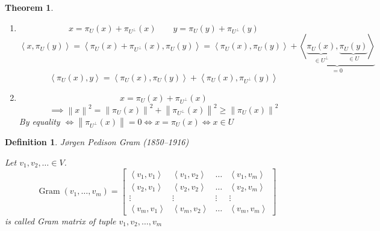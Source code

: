 \documentclass{article}
\newtheorem{theorem}{Theorem}  \numberwithin{theorem}{section}
\newtheorem{definition}{Definition}  \numberwithin{definition}{section}
\newcommand{\ip}[2]{\left\langle#1,#2\right\rangle} %
\newcommand{\norm}[1]{\left\|#1\right\|}
\begin{document}
\begin{theorem}
\begin{enumerate}
\begin{enumerate}
          \item
            \[ x = \pi_U(x) + \pi_{U^\bot}(x) \qquad y = \pi_U(y) + \pi_{U^\bot}(y) \]
            \[ \ip{x}{\pi_U(y)} = \ip{\pi_U(x) + \pi_{U^\bot}(x)}{\pi_U(y)} = \ip{\pi_U(x)}{\pi_U(y)} + \underbrace{\ip{\underbrace{\pi_U(x)}_{\in U^\bot}}{\underbrace{\pi_U(y)}_{\in U}}}_{= 0} \]
            \[ \ip{\pi_U(x)}{y} = \ip{\pi_U(x)}{\pi_U(y)} + \ip{\pi_U(x)}{\pi_{U^\bot}(y)} \]
          \item
            \[ x = \pi_U(x) + \pi_{U^\bot}(x) \]
            \[ \implies \norm{x}^2 = \norm{\pi_U(x)}^2 + \norm{\pi_{U^\bot}(x)}^2 \geq \norm{\pi_U(x)}^2 \]
            By equality $\iff \norm{\pi_{U^\bot}(x)} = 0 \iff x = \pi_U(x) \iff x \in U$
        \end{enumerate}
  \end{enumerate}
\end{theorem}

\begin{definition} %
  J{\o}rgen Pedison Gram (1850--1916)

  Let $v_1, v_2, \ldots \in V$.
  \[
    \operatorname{Gram}(v_1, \ldots, v_m) = \begin{bmatrix}
      \ip{v_1}{v_1} & \ip{v_1}{v_2} & \ldots & \ip{v_1}{v_m} \\ 
      \ip{v_2}{v_1} & \ip{v_2}{v_2} & \ldots & \ip{v_2}{v_m} \\ 
      \vdots & \vdots & \vdots & \vdots \\
      \ip{v_m}{v_1} & \ip{v_m}{v_2} & \ldots & \ip{v_m}{v_m}
    \end{bmatrix}
  \]
  is called \emph{Gram matrix of tuple $v_1, v_2, \ldots, v_m$}
\end{definition}
\end{document}
